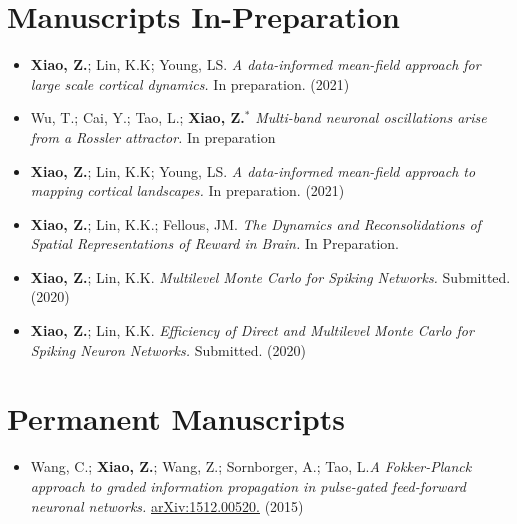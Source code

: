 \documentclass[margin, 11pt]{res} %
\begin{document}
\begin{resume}
\begin{itemize}
\end{itemize}


\medskip
\section{Manuscripts In-Preparation}
\label{Manuscripts}
\begin{itemize}
\item \textbf{Xiao, Z.}; Lin, K.K; Young, LS. \textit{A data-informed mean-field approach for large scale cortical dynamics.} In preparation. (2021)

\item Wu, T.; Cai, Y.; Tao, L.; \textbf{Xiao, Z.$^*$} \textit{Multi-band neuronal oscillations arise from a Rossler attractor.} In preparation

\item \textbf{Xiao, Z.}; Lin, K.K; Young, LS. \textit{A data-informed mean-field approach to mapping cortical landscapes.} In preparation. (2021)

\item \textbf{Xiao, Z.}; Lin, K.K.; Fellous, JM. \textit{The Dynamics and Reconsolidations of Spatial Representations of Reward in Brain.} In Preparation.


\item \textbf{Xiao, Z.}; Lin, K.K. \textit{Multilevel Monte Carlo for Spiking Networks.} Submitted. (2020)

\item \textbf{Xiao, Z.}; Lin, K.K. \textit{Efficiency of Direct and Multilevel Monte Carlo for Spiking Neuron Networks. } Submitted. (2020)
\end{itemize}

\section{Permanent Manuscripts}
\begin{itemize}
    \item Wang, C.; \textbf{Xiao, Z.}; Wang, Z.; Sornborger, A.; Tao, L.\textit{A Fokker-Planck approach to graded information propagation in pulse-gated feed-forward neuronal networks.}  \href{https://arxiv.org/abs/1512.00520}{\underline{arXiv:1512.00520.}} (2015)
\end{itemize}


\end{resume}
\end{document}
